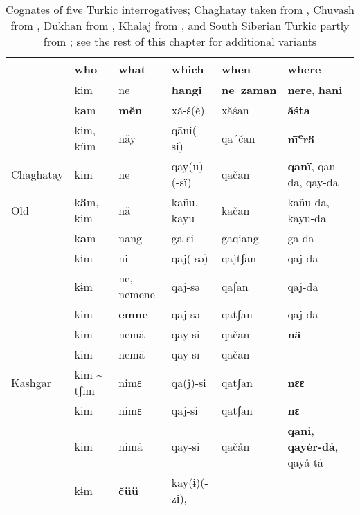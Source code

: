 \begin{table}
\caption{Cognates of five Turkic interrogatives; Chaghatay taken from \cite[171, 173]{BoeschotenVandamme1998}, Chuvash from \cite[32f.]{Landmann2014}, Dukhan from \citet[94]{Ragagnin2011}, Khalaj from \cite[107f.]{Doerfer1988}, and South Siberian Turkic partly from \cite[410]{Schönig1998}; see the rest of this chapter for additional variants}
\label{tab:turk:6}
\small
\begin{tabularx}{\textwidth}{>{\raggedright}p{15mm}lQQp{10mm}Q}
\lsptoprule
& \textbf{who} & \textbf{what} & \textbf{which} & \textbf{when} & \textbf{where}\\
\midrule
{} & kim & ne & \textbf{hangi} & \mbox{\textbf{ne zaman}} & \textbf{nere}, \textbf{hani}\\
 & k\textbf{a}m & \textbf{mĕn} & xă-š(ĕ) & xăśan & \textbf{ăśta}\\
 & kim, küm & näy & q\=ani(-si) & qa´č\=an & \textbf{n\={\i}\textsuperscript{e}}\textbf{rä}\\
 
% 
% 

Chaghatay & kim & ne & qay(u)(-sï) & qačan & \textbf{qanï}, qan-da, qay-da\\
Old  & k\textbf{ä}m, kim & nä & kañu, kayu & kačan & kañu-da, kayu-da\\
 & k\textbf{a}m & nang & ga-si & gaqiang & ga-da\\
 & kɨm & ni & qaj(-sə) & qajtʃan & qaj-da\\
 & kɨm & ne, nemene & qaj-sə & qaʃan & qaj-da\\
 & kim & \textbf{emne} & qaj-sə & qatʃan & qaj-da\\
 & kim & nemä & qay-si & qačan & \textbf{nä}\\
 & kim & nemä & qay-sı & qačan & \\
Kashgar  & kim {\textasciitilde} tʃim & nimɛ & qa(j)-si & qatʃan & \textbf{nɛɛ}\\
 & kim & nimɛ & qaj-si & qatʃan & \textbf{nɛ}\\
 & kim & nim\.{a} & qay-si & qačån & \textbf{qani}, \textbf{qay\.er-d\.{a}}, qayå-t\.{a}\\
 & kɨm & \textbf{čüü} & kay(ɨ)(-zɨ),


\end{tabularx}
\end{table}
